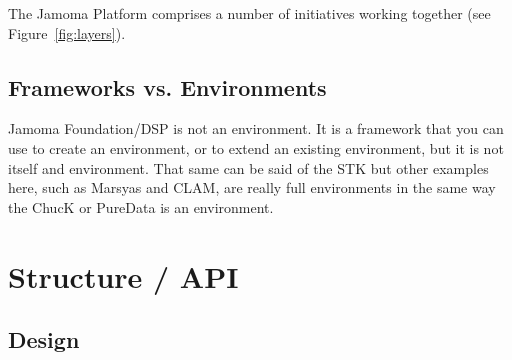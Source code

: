 \documentclass[twoside,10pt]{article}
\newenvironment{packed_item}{
\begin{itemize}
  \setlength{\itemsep}{1pt}
  \setlength{\parskip}{0pt}
  \setlength{\parsep}{0pt}
}{\end{itemize}}
\begin{document}
The Jamoma Platform comprises a number of initiatives working together
(see Figure~\ref{fig:layers}).



\subsection {Frameworks vs. Environments}


Jamoma Foundation/DSP is not an environment.  It is a framework that you can use to create an environment, or to extend an existing environment, but it is not itself and environment.  That same can be said of the STK but other examples here, such as Marsyas and CLAM, are really full environments in the same way the ChucK or PureData is an environment.





\section{Structure / API} %

\subsection{Design}

\end{document}
